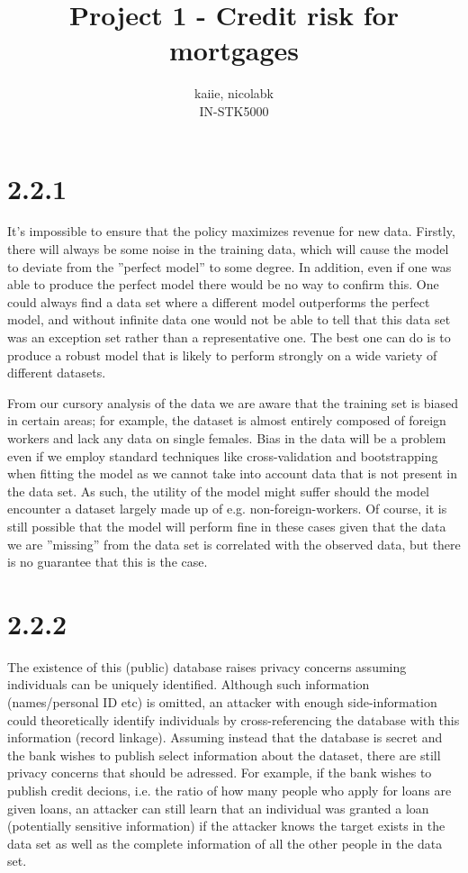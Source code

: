 \documentclass{amsart}
\title{Project 1 - Credit risk for mortgages}
\author{kaiie, nicolabk \\IN-STK5000}
\begin{document}
\maketitle{}

\section{2.2.1}

	It's impossible to ensure that the policy maximizes revenue for new data. Firstly, there will always be some noise in the training data, which will cause the model to deviate from the ''perfect model'' to some degree. In addition, even if one was able to produce the perfect model there would be no way to confirm this. One could always find a data set where a different model outperforms the perfect model, and without infinite data one would not be able to tell that this data set was an exception set rather than a representative one. The best one can do is to produce a robust model that is likely to perform strongly on a wide variety of different datasets.
	
	From our cursory analysis of the data we are aware that the training set is biased in certain areas; for example, the dataset is almost entirely composed of foreign workers and lack any data on single females. Bias in the data will be a problem even if we employ standard techniques like cross-validation and bootstrapping when fitting the model as we cannot take into account data that is not present in the data set. As such, the utility of the model might suffer should the model encounter a dataset largely made up of e.g. non-foreign-workers. Of course, it is still possible that the model will perform fine in these cases given that the data we are ''missing'' from the data set is correlated with the observed data, but there is no guarantee that this is the case.

	
\section{2.2.2}	
	The existence of this (public) database raises privacy concerns assuming individuals can be uniquely identified. Although such information (names/personal ID etc) is omitted, an attacker with enough side-information could theoretically identify individuals by cross-referencing the database with this information (record linkage). Assuming instead that the database is secret and the bank wishes to publish select information about the dataset, there are still privacy concerns that should be adressed. For example, if the bank wishes to publish credit decions, i.e. the ratio of how many people who apply for loans are given loans, an attacker can still learn that an individual was granted a loan (potentially sensitive information) if the attacker knows the target exists in the data set as well as the complete information of all the other people in the data set.
	
\end{document}
